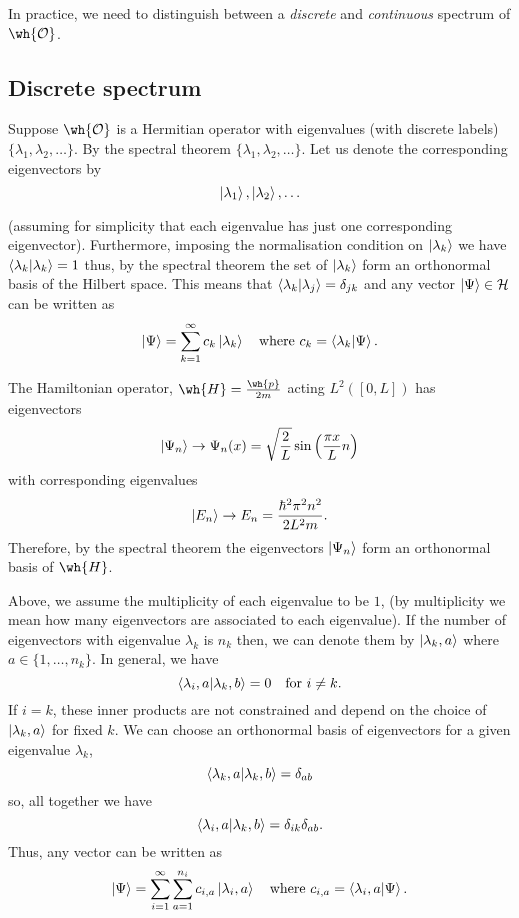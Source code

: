 \documentclass[12pt, a4paper]{article}
\begin{document}
\begin{mdnote}
    In practice, we need to distinguish between a \textit{discrete} and \textit{continuous} spectrum of \(\wh{\mathcal{O}}\).
\end{mdnote}

\subsection{Discrete spectrum}

Suppose \(\wh{\mathcal{O}}\) is a Hermitian operator with eigenvalues (with discrete labels) \(\{\lambda_1,\lambda_2,\ldots\}\). By the spectral theorem \(\{\lambda_1,\lambda_2,\ldots\}\). Let us denote the corresponding eigenvectors by 
\[\ket{\lambda_1}, \ket{\lambda_2}, \ldots\]

(assuming for simplicity that each eigenvalue has just one corresponding eigenvector). Furthermore, imposing the normalisation condition on \(\ket{\lambda_k}\) we have \(\bra{\lambda_k} \ket{\lambda_k}=1\) thus, by the spectral theorem the set of \(\ket{\lambda_k}\) form an orthonormal basis of the Hilbert space. This means that \(\bra{\lambda_k}\ket{\lambda_j}=\delta_{jk}\) and any vector \(\ket{\Psi} \in \mathcal{H}\) can be written as 
\[\ket{\Psi} = \sum_{k=1}^{\infty} c_k \ket{\lambda_k} \quad \text{where } c_k = \bra{\lambda_k} \ket{\Psi}.\]

\begin{mdexample}
    The Hamiltonian operator, \(\wh{H} = \frac{\wh{p}}{2m}\) acting \(L^2([0,L])\) has eigenvectors
    \[\ket{\Psi_n} \to \Psi_n(x) = \sqrt{\frac{2}{L}} \sin\left( \frac{\pi x}{L} n\right)\]
    with corresponding eigenvalues
    \[\ket{E_n} \to E_n =\frac{\hbar^2 \pi^2 n^2}{2L^2 m}.\]
    Therefore, by the spectral theorem the eigenvectors \(\ket{\Psi_n}\) form an orthonormal basis of \(\wh{H}\).
\end{mdexample}

\begin{mdremark}
    Above, we assume the multiplicity of each eigenvalue to be \(1\), (by multiplicity we mean how many eigenvectors are associated to each eigenvalue). If the number of eigenvectors with eigenvalue \(\lambda_k\) is \(n_k\) then, we can denote them by \(\ket{\lambda_k,a}\) where \(a \in \{1,\ldots, n_k\}\). In general, we have 
    \[\bra{\lambda_i, a} \ket{\lambda_k,b}=0 \quad \text{for } i \neq k.\]
    If \(i=k\), these inner products are not constrained and depend on the choice of \(\ket{\lambda_k,a}\) for fixed \(k\). We can choose an orthonormal basis of eigenvectors for a given eigenvalue \(\lambda_k\),
    \[\bra{\lambda_k,a} \ket{\lambda_k,b} = \delta_{ab}\]
    so, all together we have 
    \[\bra{\lambda_i,a} \ket{\lambda_k,b} =\delta_{ik} \delta_{ab}.\]
    Thus, any vector can be written as 
    \[\ket{\Psi} = \sum_{i=1}^{\infty} \sum_{a=1}^{n_i} c_{i,a} \ket{\lambda_i,a} \quad \text{where } c_{i,a} = \bra{\lambda_i,a} \ket{\Psi}.\]
\end{mdremark}
\end{document}
